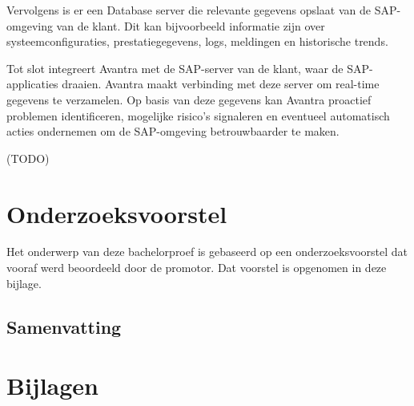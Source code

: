 \documentclass[dutch,dit,thesis]{hogentreport}
\begin{document}
Vervolgens is er een Database server die relevante gegevens opslaat van de SAP-omgeving van de klant. Dit kan bijvoorbeeld informatie zijn over systeemconfiguraties, prestatiegegevens, logs, meldingen en historische trends. 

Tot slot integreert Avantra met de SAP-server van de klant, waar de SAP-applicaties draaien. Avantra maakt verbinding met deze server om real-time gegevens te verzamelen.
Op basis van deze gegevens kan Avantra proactief problemen identificeren, mogelijke risico's signaleren en eventueel automatisch acties ondernemen om de SAP-omgeving betrouwbaarder te maken.

(TODO)


%
%




\appendix

\chapter{Onderzoeksvoorstel}

Het onderwerp van deze bachelorproef is gebaseerd op een onderzoeksvoorstel dat vooraf werd beoordeeld door de promotor. Dat voorstel is opgenomen in deze bijlage.




\section*{Samenvatting}






%

\chapter{Bijlagen}
\end{document}
